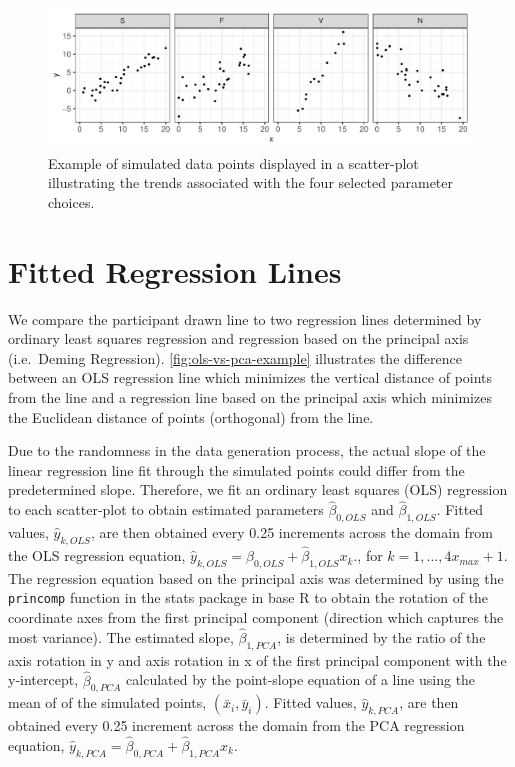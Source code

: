 \begin{appendix}
\begin{figure}

{\centering \includegraphics[width=1\linewidth]{./images/eyefitting-simplot-1} 

}

\caption{Example of simulated data points displayed in a scatter-plot illustrating the trends associated with the four selected parameter choices.}\label{fig:eyefitting-simplot}
\end{figure}

\hypertarget{fitted-regression-lines}{%
\section{\texorpdfstring{Fitted Regression Lines
\label{app:fitted-regression}}{Fitted Regression Lines }}\label{fitted-regression-lines}}

We compare the participant drawn line to two regression lines determined
by ordinary least squares regression and regression based on the
principal axis (i.e.~Deming Regression). \cref{fig:ols-vs-pca-example}
illustrates the difference between an OLS regression line which
minimizes the vertical distance of points from the line and a regression
line based on the principal axis which minimizes the Euclidean distance
of points (orthogonal) from the line.

Due to the randomness in the data generation process, the actual slope
of the linear regression line fit through the simulated points could
differ from the predetermined slope. Therefore, we fit an ordinary least
squares (OLS) regression to each scatter-plot to obtain estimated
parameters \(\hat\beta_{0,OLS}\) and \(\hat\beta_{1,OLS}\). Fitted
values, \(\hat y_{k,OLS}\), are then obtained every 0.25 increments
across the domain from the OLS regression equation,
\(\hat y_{k,OLS} = \hat\beta_{0,OLS} + \hat\beta_{1,OLS} x_k\)., for
\(k = 1, ..., 4 x_{max} +1\). The regression equation based on the
principal axis was determined by using the \texttt{princomp} function in
the stats package in base R to obtain the rotation of the coordinate
axes from the first principal component (direction which captures the
most variance). The estimated slope, \(\hat\beta_{1,PCA}\), is
determined by the ratio of the axis rotation in y and axis rotation in x
of the first principal component with the y-intercept,
\(\hat\beta_{0,PCA}\) calculated by the point-slope equation of a line
using the mean of of the simulated points, \((\bar x_i, \bar y_i)\).
Fitted values, \(\hat y_{k,PCA}\), are then obtained every 0.25
increment across the domain from the PCA regression equation,
\(\hat y_{k,PCA} = \hat\beta_{0,PCA} + \hat\beta_{1,PCA} x_k\).


\end{appendix}
